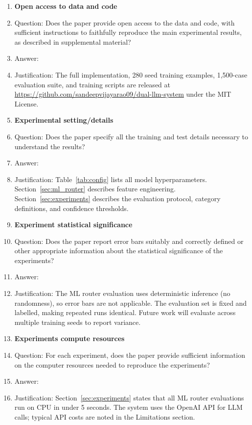 \begin{enumerate}
\item {\bf Open access to data and code}
    \item[] Question: Does the paper provide open access to the data and code, with sufficient instructions to faithfully reproduce the main experimental results, as described in supplemental material?
    \item[] Answer: \answerYes{}
    \item[] Justification: The full implementation, 280 seed training examples, 1,500-case evaluation suite, and training scripts are released at \url{https://github.com/sandeepvijayarao09/dual-llm-system} under the MIT License.

\item {\bf Experimental setting/details}
    \item[] Question: Does the paper specify all the training and test details necessary to understand the results?
    \item[] Answer: \answerYes{}
    \item[] Justification: Table~\ref{tab:config} lists all model hyperparameters. Section~\ref{sec:ml_router} describes feature engineering. Section~\ref{sec:experiments} describes the evaluation protocol, category definitions, and confidence thresholds.

\item {\bf Experiment statistical significance}
    \item[] Question: Does the paper report error bars suitably and correctly defined or other appropriate information about the statistical significance of the experiments?
    \item[] Answer: \answerNo{}
    \item[] Justification: The ML router evaluation uses deterministic inference (no randomness), so error bars are not applicable. The evaluation set is fixed and labelled, making repeated runs identical. Future work will evaluate across multiple training seeds to report variance.

\item {\bf Experiments compute resources}
    \item[] Question: For each experiment, does the paper provide sufficient information on the computer resources needed to reproduce the experiments?
    \item[] Answer: \answerYes{}
    \item[] Justification: Section~\ref{sec:experiments} states that all ML router evaluations run on CPU in under 5 seconds. The system uses the OpenAI API for LLM calls; typical API costs are noted in the Limitations section.


\end{enumerate}
